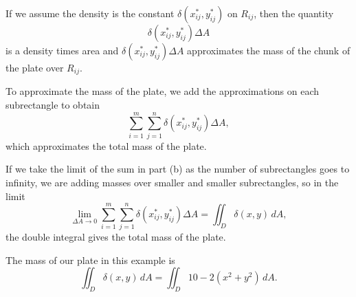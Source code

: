 \begin{activitySolution} 

    \ba
    \item If we assume the density is the constant $\delta(x_{ij}^*,y_{ij}^*)$ on $R_{ij}$, then the quantity
\[\delta(x_{ij}^*,y_{ij}^*) \Delta A\]
is a density times area and $\delta(x_{ij}^*,y_{ij}^*) \Delta A$ approximates the mass of the chunk of the plate over $R_{ij}$.

        \item To approximate the mass of the plate, we add the approximations on each subrectangle to obtain
\[\sum_{i=1}^m \sum_{j=1}^n \delta(x_{ij}^*,y_{ij}^*) \Delta A,\]
which approximates the total mass of the plate.


        \item If we take the limit of the sum in part (b) as the number of subrectangles goes to infinity, we are adding masses over smaller and smaller subrectangles, so in the limit 
\[\lim_{\Delta A \to 0} \sum_{i=1}^m \sum_{j=1}^n \delta(x_{ij}^*,y_{ij}^*) \Delta A = \iint_D \delta(x,y) \, dA,\]
the double integral gives the total mass of the plate.

        \item The mass of our plate in this example is
\[\iint_D \delta(x,y) \, dA = \iint_D 10-2(x^2+y^2) \, dA.\]


\ea
\end{activitySolution}
 \afterpa 